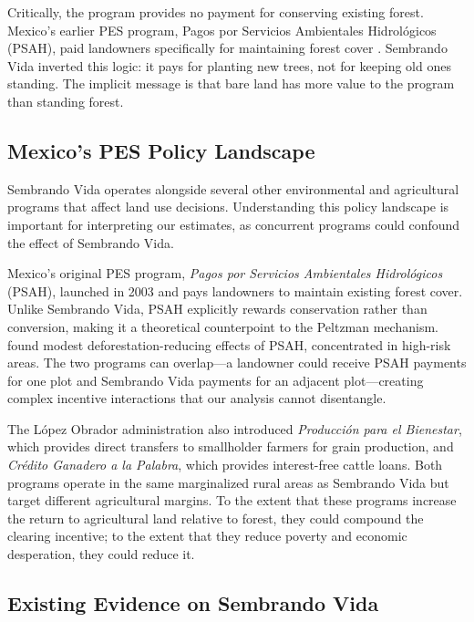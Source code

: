 \documentclass[12pt]{article}
\begin{document}
Critically, the program provides no payment for conserving existing forest. Mexico's earlier PES program, Pagos por Servicios Ambientales Hidrol\'{o}gicos (PSAH), paid landowners specifically for maintaining forest cover \citep{alix2012deforestation}. Sembrando Vida inverted this logic: it pays for planting new trees, not for keeping old ones standing. The implicit message is that bare land has more value to the program than standing forest.

\subsection{Mexico's PES Policy Landscape}

Sembrando Vida operates alongside several other environmental and agricultural programs that affect land use decisions. Understanding this policy landscape is important for interpreting our estimates, as concurrent programs could confound the effect of Sembrando Vida.

Mexico's original PES program, \textit{Pagos por Servicios Ambientales Hidrol\'{o}gicos} (PSAH), launched in 2003 and pays landowners to maintain existing forest cover. Unlike Sembrando Vida, PSAH explicitly rewards conservation rather than conversion, making it a theoretical counterpoint to the Peltzman mechanism. \citet{alix2012deforestation} found modest deforestation-reducing effects of PSAH, concentrated in high-risk areas. The two programs can overlap---a landowner could receive PSAH payments for one plot and Sembrando Vida payments for an adjacent plot---creating complex incentive interactions that our analysis cannot disentangle.

The L\'{o}pez Obrador administration also introduced \textit{Producci\'{o}n para el Bienestar}, which provides direct transfers to smallholder farmers for grain production, and \textit{Cr\'{e}dito Ganadero a la Palabra}, which provides interest-free cattle loans. Both programs operate in the same marginalized rural areas as Sembrando Vida but target different agricultural margins. To the extent that these programs increase the return to agricultural land relative to forest, they could compound the clearing incentive; to the extent that they reduce poverty and economic desperation, they could reduce it.

\subsection{Existing Evidence on Sembrando Vida}
\end{document}
